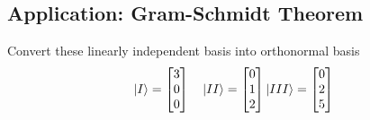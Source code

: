 \documentclass[../main.tex]{subfiles}
\begin{document}
\subsection*{Application: Gram-Schmidt Theorem}
Convert these linearly independent basis into orthonormal basis
\begin{equation*}
	\ket{I}=\begin{bmatrix}
		3 \\0\\0
	\end{bmatrix}\quad
	\ket{II}=\begin{bmatrix}
		0 \\1\\2
	\end{bmatrix}
	\ket{III}=\begin{bmatrix}
		0 \\2\\5
	\end{bmatrix}
\end{equation*}
\end{document}
